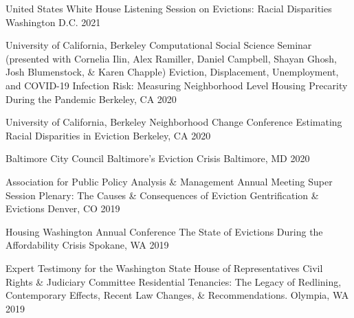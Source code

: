 


\begin{cventries}

  \cventry
    {United States White House} %
    {Listening Session on Evictions: Racial Disparities} %
    {Washington D.C.} %
    {2021} %
    {}

  \cventry
    {University of California, Berkeley Computational Social Science Seminar (presented with Cornelia Ilin, Alex Ramiller, Daniel Campbell, Shayan Ghosh, Josh Blumenstock, \& Karen Chapple)} %
    {Eviction, Displacement, Unemployment, and COVID-19 Infection Risk: Measuring Neighborhood Level Housing Precarity During the Pandemic} %
    {Berkeley, CA} %
    {2020} %
    {}

  \cventry
    {University of California, Berkeley Neighborhood Change Conference} %
    {Estimating Racial Disparities in Eviction} %
    {Berkeley, CA} %
    {2020} %
    {}

  \cventry
    {Baltimore City Council} %
    {Baltimore's Eviction Crisis} %
    {Baltimore, MD} %
    {2020} %
    {}

  \cventry
    {Association for Public Policy Analysis \& Management Annual Meeting Super Session Plenary: The Causes \& Consequences of Eviction} %
    {Gentrification \& Evictions} %
    {Denver, CO} %
    {2019} %
    {}

  \cventry
    {Housing Washington Annual Conference} %
    {The State of Evictions During the Affordability Crisis} %
    {Spokane, WA} %
    {2019} %
    {}

  \cventry
    {Expert Testimony for the Washington State House of Representatives Civil Rights \& Judiciary Committee} %
    {Residential Tenancies: The Legacy of Redlining, Contemporary Effects, Recent Law Changes, \& Recommendations.} %
    {Olympia, WA} %
    {2019} %
    {}


\end{cventries}
